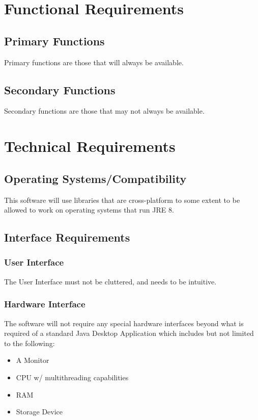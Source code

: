 \documentclass[12pt, draft]{article}
\begin{document}
\section{Functional Requirements}

\subsection{Primary Functions}
Primary functions are those that will always be available.
\subsection{Secondary Functions}
Secondary functions are those that may not always be available.
\section{Technical Requirements}
\subsection{Operating Systems/Compatibility}

This software will use libraries that are cross-platform to some extent
to be allowed to work on operating systems that run JRE 8.

\subsection{Interface Requirements}

\subsubsection{User Interface}\label{user-interface}

The User Interface must not be cluttered, and needs to be intuitive.

\subsubsection{ Hardware Interface}
The software will not require any special hardware interfaces beyond what is required of a standard Java Desktop Application which includes but not limited to the following:
\begin{itemize}
\item A Monitor
\item CPU w/ multithreading capabilities
\item RAM
\item Storage Device
\end{itemize}
\end{document}
